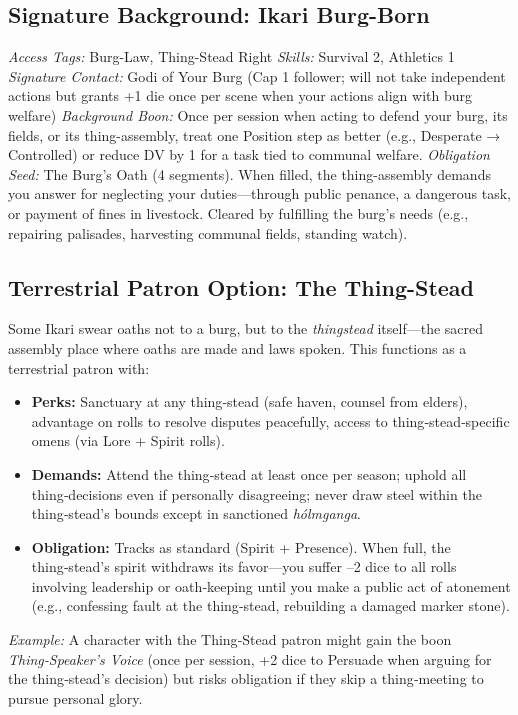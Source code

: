 \documentclass[12pt]{article}
\begin{document}
\subsection{Signature Background: Ikari Burg-Born}
\textit{Access Tags:} Burg-Law, Thing-Stead Right  
\textit{Skills:} Survival 2, Athletics 1  
\textit{Signature Contact:} Godi of Your Burg (Cap 1 follower; will not take independent actions but grants +1 die once per scene when your actions align with burg welfare)  
\textit{Background Boon:} Once per session when acting to defend your burg, its fields, or its thing-assembly, treat one Position step as better (e.g., Desperate → Controlled) or reduce DV by 1 for a task tied to communal welfare.  
\textit{Obligation Seed:} The Burg's Oath (4 segments). When filled, the thing-assembly demands you answer for neglecting your duties---through public penance, a dangerous task, or payment of fines in livestock. Cleared by fulfilling the burg's needs (e.g., repairing palisades, harvesting communal fields, standing watch).

\subsection{Terrestrial Patron Option: The Thing-Stead}
Some Ikari swear oaths not to a burg, but to the \textit{thingstead} itself---the sacred assembly place where oaths are made and laws spoken. This functions as a terrestrial patron with:
\begin{itemize}[leftmargin=*]
  \item \textbf{Perks:} Sanctuary at any thing‑stead (safe haven, counsel from elders), advantage on rolls to resolve disputes peacefully, access to thing‑stead‑specific omens (via Lore + Spirit rolls).
  \item \textbf{Demands:} Attend the thing‑stead at least once per season; uphold all thing‑decisions even if personally disagreeing; never draw steel within the thing‑stead's bounds except in sanctioned \textit{hólmganga}.
  \item \textbf{Obligation:} Tracks as standard (Spirit + Presence). When full, the thing‑stead's spirit withdraws its favor---you suffer --2 dice to all rolls involving leadership or oath‑keeping until you make a public act of atonement (e.g., confessing fault at the thing‑stead, rebuilding a damaged marker stone).
\end{itemize}
\noindent\textit{Example:} A character with the Thing‑Stead patron might gain the boon \textit{Thing‑Speaker's Voice} (once per session, +2 dice to Persuade when arguing for the thing‑stead's decision) but risks obligation if they skip a thing‑meeting to pursue personal glory.
\end{document}
